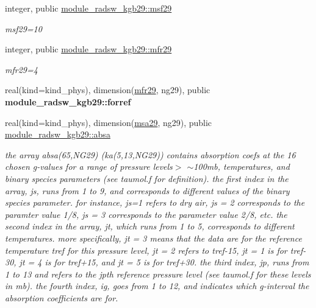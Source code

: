 \begin{DoxyCompactItemize}
integer, public \hyperlink{group__module__radsw__kgbnn_gace849342fcb0d18d825318a2ee26ce0e}{module\+\_\+radsw\+\_\+kgb29\+::msf29}
\begin{DoxyCompactList}\small\item\em msf29=10 \end{DoxyCompactList}\item 
\mbox{\label{group__module__radsw__kgbnn_ga866ce18e53b84d75d51dd8c6a999ee7b}} 
integer, public \hyperlink{group__module__radsw__kgbnn_ga866ce18e53b84d75d51dd8c6a999ee7b}{module\+\_\+radsw\+\_\+kgb29\+::mfr29}
\begin{DoxyCompactList}\small\item\em mfr29=4 \end{DoxyCompactList}\item 
\mbox{\label{group__module__radsw__kgbnn_ga6e4d495b4588d3c794047e71497661a0}} 
real(kind=kind\+\_\+phys), dimension(\hyperlink{group__module__radsw__kgbnn_ga866ce18e53b84d75d51dd8c6a999ee7b}{mfr29}, ng29), public {\bfseries module\+\_\+radsw\+\_\+kgb29\+::forref}
\item 
\mbox{\label{group__module__radsw__kgbnn_ga1132fd19edc0312f6bcc905619f3bdfd}} 
real(kind=kind\+\_\+phys), dimension(\hyperlink{namespacemodule__radsw__kgb29_adbee6e5d3b3efc437ff8815e42962b92}{msa29}, ng29), public \hyperlink{group__module__radsw__kgbnn_ga1132fd19edc0312f6bcc905619f3bdfd}{module\+\_\+radsw\+\_\+kgb29\+::absa}
\begin{DoxyCompactList}\small\item\em the array absa(65,\+N\+G29) (ka(5,13,\+N\+G29)) contains absorption coefs at the 16 chosen g-\/values for a range of pressure levels$>$ $\sim$100mb, temperatures, and binary species parameters (see taumol.\+f for definition). the first index in the array, js, runs from 1 to 9, and corresponds to different values of the binary species parameter. for instance, js=1 refers to dry air, js = 2 corresponds to the paramter value 1/8, js = 3 corresponds to the parameter value 2/8, etc. the second index in the array, jt, which runs from 1 to 5, corresponds to different temperatures. more specifically, jt = 3 means that the data are for the reference temperature tref for this pressure level, jt = 2 refers to tref-\/15, jt = 1 is for tref-\/30, jt = 4 is for tref+15, and jt = 5 is for tref+30. the third index, jp, runs from 1 to 13 and refers to the jpth reference pressure level (see taumol.\+f for these levels in mb). the fourth index, ig, goes from 1 to 12, and indicates which g-\/interval the absorption coefficients are for. \end{DoxyCompactList}\item 

\end{DoxyCompactItemize}
